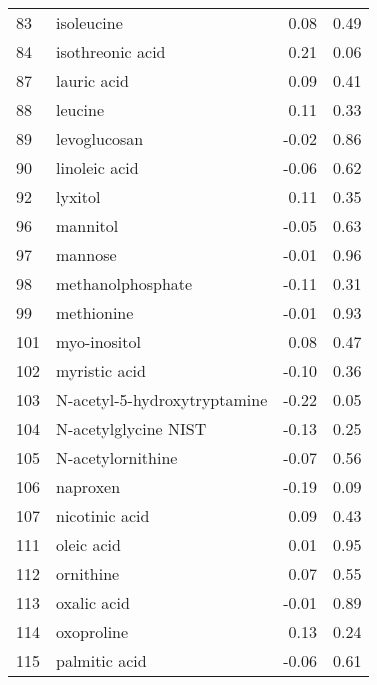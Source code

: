 \begin{tabular}{llrr}
83  &                         isoleucine &                 0.08 &     0.49 \\
84  &                   isothreonic acid &                 0.21 &     0.06 \\
87  &                        lauric acid &                 0.09 &     0.41 \\
88  &                            leucine &                 0.11 &     0.33 \\
89  &                       levoglucosan &                -0.02 &     0.86 \\
90  &                      linoleic acid &                -0.06 &     0.62 \\
92  &                            lyxitol &                 0.11 &     0.35 \\
96  &                           mannitol &                -0.05 &     0.63 \\
97  &                            mannose &                -0.01 &     0.96 \\
98  &                  methanolphosphate &                -0.11 &     0.31 \\
99  &                         methionine &                -0.01 &     0.93 \\
101 &                       myo-inositol &                 0.08 &     0.47 \\
102 &                      myristic acid &                -0.10 &     0.36 \\
103 &       N-acetyl-5-hydroxytryptamine &                -0.22 &     0.05 \\
104 &               N-acetylglycine NIST &                -0.13 &     0.25 \\
105 &                  N-acetylornithine &                -0.07 &     0.56 \\
106 &                           naproxen &                -0.19 &     0.09 \\
107 &                     nicotinic acid &                 0.09 &     0.43 \\
111 &                         oleic acid &                 0.01 &     0.95 \\
112 &                          ornithine &                 0.07 &     0.55 \\
113 &                        oxalic acid &                -0.01 &     0.89 \\
114 &                         oxoproline &                 0.13 &     0.24 \\
115 &                      palmitic acid &                -0.06 &     0.61 \\

\end{tabular}
